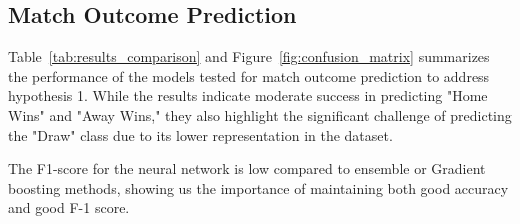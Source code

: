 \documentclass{article}
\begin{document}
\subsection{Match Outcome Prediction}

Table~\ref{tab:results_comparison} and Figure~\ref{fig:confusion_matrix} summarizes the performance of the models tested for match outcome prediction to address hypothesis 1. While the results indicate moderate success in predicting "Home Wins" and "Away Wins," they also highlight the significant challenge of predicting the "Draw" class due to its lower representation in the dataset. 

\begin{table}[htbp]
    \centering
    \caption{Comparison of Model Results}
    \label{tab:results_comparison}
\end{table}


The F1-score for the neural network is low compared to ensemble or Gradient boosting methods, showing us the importance of maintaining both good accuracy and good F-1 score.
\end{document}
